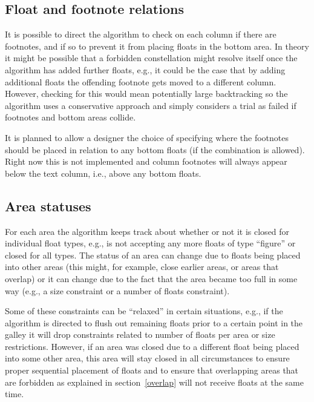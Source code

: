 \documentclass[twocolumn]{article}
\begin{document}
\subsection{Float and footnote relations}

It is possible to direct the algorithm to check on each column if
there are footnotes, and if so to prevent it from placing floats in
the bottom 
area. In theory it might be possible that a forbidden constellation
might resolve itself once the algorithm has added further floats,
e.g., it could be the case that by adding additional floats the
offending footnote gets moved to a different column. However, checking
for this would mean potentially large backtracking so the algorithm
uses a conservative approach and simply considers a trial as failed if
footnotes and bottom areas collide.

It is planned to allow a designer the choice of specifying where the
footnotes should be placed in relation to any bottom floats (if the
combination is allowed). Right now this is not implemented and
column footnotes will always appear below the text column, i.e., above
any bottom floats.



\subsection{Area statuses}

For each area the algorithm keeps track about whether or not it is
closed for individual float types, e.g., is not accepting any more
floats of type ``figure'' or closed for all types. The status of an
area can change due to floats being placed into other areas (this
might, for example, close earlier areas, or areas that overlap) or it
can change due to the fact that the area became too full in some way
(e.g., a size constraint or a number of floats constraint).

Some of these constraints can be ``relaxed'' in certain situations,
e.g., if the algorithm is directed to flush out remaining floats prior
to a certain point in the galley it will drop constraints related to
number of floats per area or size restrictions. However, if an area
was closed due to a different float being placed into some other area,
this area will stay closed in all circumstances to ensure proper
sequential placement of floats and to ensure that overlapping areas
that are forbidden as explained in section~\vref{overlap} will not
receive floats at the same time.
\end{document}
